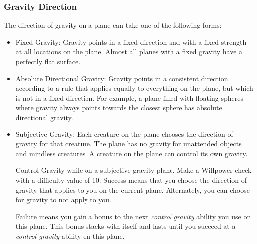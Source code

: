     \subsubsection{Gravity Direction}
      The direction of gravity on a plane can take one of the following forms:
      \begin{itemize}
        \item Fixed Gravity: Gravity points in a fixed direction and with a fixed strength at all locations on the plane.
          Almost all planes with a fixed gravity have a perfectly flat surface.
        \item Absolute Directional Gravity: Gravity points in a consistent direction according to a rule that applies equally to everything on the plane, but which is not in a fixed direction.
          For example, a plane filled with floating spheres where gravity always points towards the closest sphere has absolute directional gravity.
        \item Subjective Gravity: Each creature on the plane chooses the direction of gravity for that creature.
          The plane has no gravity for unattended objects and mindless creatures.
          A creature on the plane can control its own gravity.
          \begin{activeability}{Control Gravity}
            \abilityusagetime {} while on a subjective gravity plane.
            \rankline
            Make a Willpower check with a difficulty value of 10.
            Success means that you choose the direction of gravity that applies to you on the current plane.
            Alternately, you can choose for gravity to not apply to you.

            Failure means you gain a  bonus to the next \textit{control gravity} ability you use on this plane.
            This bonus stacks with itself and lasts until you succeed at a \textit{control gravity} ability on this plane.
          \end{activeability}
      \end{itemize}

